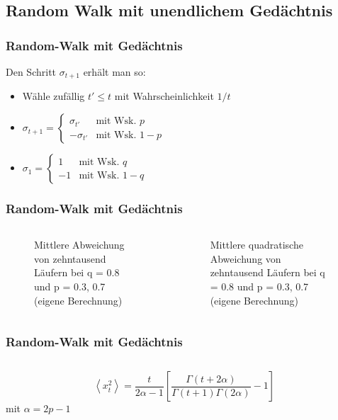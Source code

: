 \documentclass{beamer}
\begin{document}
\subsection{Random Walk mit unendlichem Gedächtnis}
{ %
\begin{frame}
	\frametitle{Random-Walk mit Gedächtnis}
	Den Schritt $\sigma_{t+1}$ erhält man so:
	\begin{itemize}
		\item Wähle zufällig $t' \leq t$ mit Wahrscheinlichkeit $1/t$
		\item $\sigma_{t+1} = \begin{cases}
			\sigma_{t'} & \text{mit Wsk. } p \\
			-\sigma_{t'} & \text{mit Wsk. } 1-p
		\end{cases}$
		\item $\sigma_{1} = \begin{cases}
			1 & \text{mit Wsk. } q \\
			-1 & \text{mit Wsk. } 1-q
		\end{cases}$
	\end{itemize}
\end{frame}
\begin{frame}
	\frametitle{Random-Walk mit Gedächtnis}
	\begin{columns}[c]
		\begin{column}[]{.5\textwidth}
			\begin{figure}
				\centering
				\caption{Mittlere Abweichung von zehntausend Läufern bei q = 0.8 und p = 0.3, 0.7 (eigene Berechnung)}
			\end{figure}
		\end{column}
		\begin{column}[]{.5\textwidth}
			\begin{figure}
				\centering
				\caption{Mittlere quadratische Abweichung von zehntausend Läufern bei q = 0.8 und p = 0.3, 0.7 (eigene Berechnung)}
			\end{figure}
		\end{column}
	\end{columns}
\end{frame}
\begin{frame}
	\frametitle{Random-Walk mit Gedächtnis}
	\begin{columns}[t]
		\begin{column}[]{.5\textwidth}
			\tiny
			\begin{equation*}
				\left\langle x_{t}^{2}\right\rangle=\frac{t}{2 \alpha-1}\left[\frac{\Gamma(t+2 \alpha)}{\Gamma(t+1) \Gamma(2 \alpha)}-1\right]
			\end{equation*}
			mit $\alpha = 2p-1$


\end{column}
\end{columns}
\end{frame}}
\end{document}
